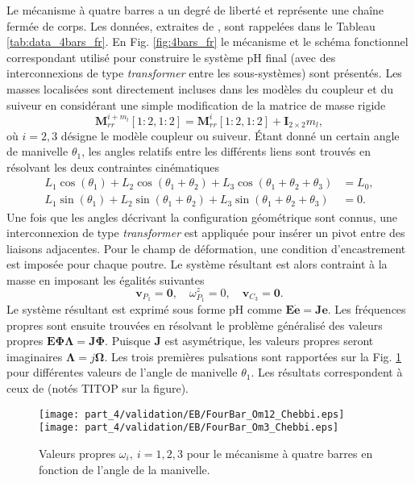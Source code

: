 Le mécanisme à quatre barres a un degré de liberté et représente une chaîne fermée de corps. Les données, extraites de \cite{kitis1990natural,chebbi2017}, sont rappelées dans le Tableau \ref{tab:data_4bars_fr}. En Fig. \ref{fig:4bars_fr} le mécanisme et le schéma fonctionnel correspondant utilisé pour construire le système pH final (avec des interconnexions de type \textit{transformer} entre les sous-systèmes) sont présentés. Les masses localisées sont directement incluses dans les modèles du coupleur et du suiveur en considérant une simple modification de la matrice de masse rigide
\begin{equation*}
\mathbf{M}_{rr}^{i + m_l}[1:2,1:2] = \mathbf{M}_{rr}^{i}[1:2,1:2] + \mathbf{I}_{2\times 2} m_l,
\end{equation*} 
où $i = 2,3$ désigne le modèle coupleur ou suiveur. Étant donné un certain angle de manivelle $\theta_1$, les angles relatifs entre les différents liens sont trouvés en résolvant les deux contraintes cinématiques
\begin{align*}
L_1 \cos(\theta_1)+ L_2 \cos(\theta_1+\theta_2)+ L_3 \cos(\theta_1+\theta_2+\theta_3) &=L_0, \\
L_1 \sin(\theta_1)+L_2 \sin(\theta_1+\theta_2)+L_3 \sin(\theta_1+\theta_2+\theta_3) &=0.
\end{align*} 
Une fois que les angles décrivant la configuration géométrique sont connus, une interconnexion de type \textit{transformer} est appliquée pour insérer un pivot entre des liaisons adjacentes. Pour le champ de déformation, une condition d'encastrement est imposée pour chaque poutre. Le système résultant est alors contraint à la masse en imposant les égalités suivantes
\begin{equation*}
\mathbf{v}_{P_1} = \mathbf{0}, \quad \omega^z_{P_1} = 0, \quad \mathbf{v}_{C_3} = \mathbf{0}.
\end{equation*}
Le système résultant est exprimé sous forme pH comme $\mathbf{E} \dot{\mathbf{e}} = \mathbf{J} \mathbf{e}$. Les fréquences propres sont ensuite trouvées en résolvant le problème généralisé des valeurs propres $\mathbf{E} \bm{\Phi \Lambda} = \mathbf{J} \bm{\Phi} $. Puisque $\mathbf{J} $ est asymétrique, les valeurs propres seront imaginaires $\bm{\Lambda} = j \bm{\Omega} $. Les trois premières pulsations sont rapportées sur la Fig. \ref{fig:omega_4bars_fr} pour différentes valeurs de l'angle de manivelle $\theta_1$. Les résultats correspondent à ceux de \cite{chebbi2017} (notés TITOP sur la figure).

\begin{figure}[tb]
	\centering
	\texttt{[image: part\_4/validation/EB/FourBar\_Om12\_Chebbi.eps]} 
	\texttt{[image: part\_4/validation/EB/FourBar\_Om3\_Chebbi.eps]} 
	\caption{Valeurs propres $\omega_i, \ i = 1,2,3 $ pour le mécanisme à quatre barres en fonction de l'angle de la manivelle.}
	\label{fig:omega_4bars_fr}
\end{figure}


